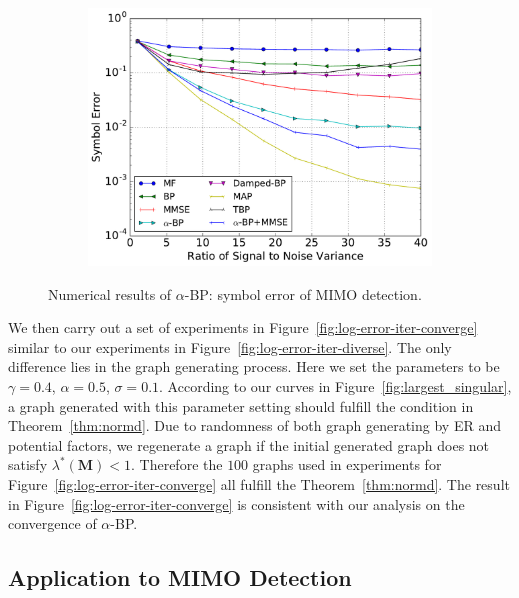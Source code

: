 \begin{figure}[!t]
\begin{subfigure}{0.5\textwidth}
    \includegraphics[width=1\columnwidth]{figures/tbp/mf_tbp_compare.pdf}
    \caption{}
    \label{fig:mimo_c}
  \end{subfigure}
  \caption{Numerical results of $\alpha$-BP: symbol error of MIMO detection.}
  \label{fig:mimo_detection}
\end{figure}

We then carry out a set of experiments in Figure~\ref{fig:log-error-iter-converge} similar to our experiments in Figure~\ref{fig:log-error-iter-diverse}. The only difference lies in the graph generating process. Here we set the parameters to be $\gamma =0.4$, $\alpha = 0.5$, $\sigma = 0.1$. According to our curves in Figure~\ref{fig:largest_singular}, a graph generated with this parameter setting should fulfill the condition in Theorem~\ref{thm:normd}. Due to randomness of both graph generating by ER and potential factors, we regenerate a graph if the initial generated graph does not satisfy $\lambda^{\ast}(\bm{M})<1$. Therefore the $100$ graphs used in experiments for Figure~\ref{fig:log-error-iter-converge} all fulfill the Theorem~\ref{thm:normd}. The result in Figure~\ref{fig:log-error-iter-converge} is consistent with our analysis on the convergence of $\alpha$-BP.



\subsection{Application to MIMO Detection}

